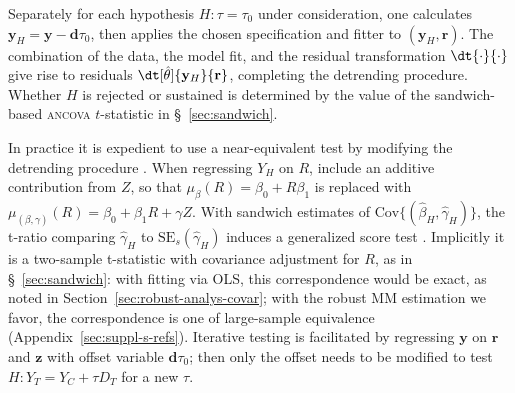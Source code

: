 Separately for each hypothesis $H: \tau=\tau_0$ under
consideration, one calculates
$\mathbf{y}_{H} = \mathbf{y} - \mathbf{d}\tau_{0}$, then
applies the chosen specification and fitter to
$(\mathbf{y}_{H}, \mathbf{r})$.
The combination of the data, the
model fit, and the residual transformation $\dt{\cdot}{\cdot}$ give rise to residuals
$\dt[\hat\theta]{\mathbf{y}_{H}}{\mathbf{r}}$, completing the
detrending procedure. Whether $H$ is rejected or sustained is
determined by the value of the sandwich-based \textsc{ancova} $t$-statistic
in \S~\ref{sec:sandwich}.

In practice it is expedient to use a near-equivalent
test by modifying the detrending
procedure%
.
When regressing $Y_{H}$ on $R$, include an additive
contribution from $Z$, so that $\mu_{\beta}(R) =\beta_{0} +
R\beta_{1}$ is replaced with $\mu_{(\beta,\gamma)}(R) =\beta_{0} +
\beta_{1}R + \gamma Z$. With sandwich estimates of
$\text{Cov}\{(\hat{\beta}_{H}, \hat{\gamma}_{H})\}$,
%
%
the t-ratio comparing $\hat{\gamma}_{H}$ to
$\text{SE}_{s}(\hat{\gamma}_{H})$ induces a generalized score test \citep{boos1992genscoretest}. Implicitly it is a two-sample
t-statistic with covariance adjustment for $R$, as in \S~\ref{sec:sandwich}: with fitting via OLS,
this correspondence would be exact, as noted in Section~\ref{sec:robust-analys-covar}; with the robust MM estimation we
favor, the correspondence is one of large-sample equivalence
(Appendix~\ref{sec:suppl-s-refs}).
Iterative testing is facilitated by regressing $\mathbf{y}$ on $\mathbf{r}$ and $\mathbf{z}$
with offset variable $\mathbf{d}\tau_{0}$; then only the offset needs to
be modified to test $H: Y_{T} = Y_{C} +  \tau D_{T}$ for a new $\tau$.

